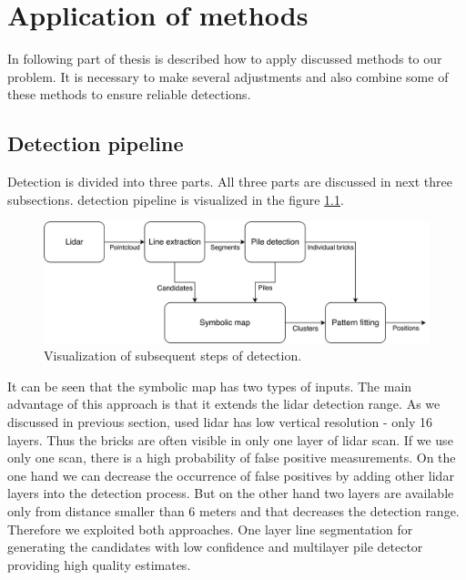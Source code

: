 \chapter{Application of methods}
In following part of thesis is described how to apply discussed methods to our problem. It is necessary to make several adjustments and also combine some of these methods to ensure reliable detections.

\section{Detection pipeline}
Detection is divided into three parts. All three parts are discussed in next three subsections. detection pipeline is visualized in the figure \ref{fig:flowchart}. 

\hspace{5px}
\begin{figure}[H]
\centering
\includegraphics[scale=0.06]{fig/flowchart.pdf}
\caption[Program pipeline]{Visualization of subsequent steps of detection.}
\label{fig:flowchart}
\end{figure}

It can be seen that the symbolic map has two types of inputs. The main advantage of this approach is that it extends the lidar detection range. As we discussed in previous section, used lidar has low vertical resolution - only 16 layers. Thus the bricks are often visible in only one layer of lidar scan. If we use only one scan, there is a high probability of false positive measurements. On the one hand we can decrease the occurrence of false positives by adding other lidar layers into the detection process. But on the other hand two layers are available only from distance smaller than 6 meters and that decreases the detection range. Therefore we exploited both approaches. One layer line segmentation for generating the candidates with low confidence and multilayer pile detector providing high quality estimates.

